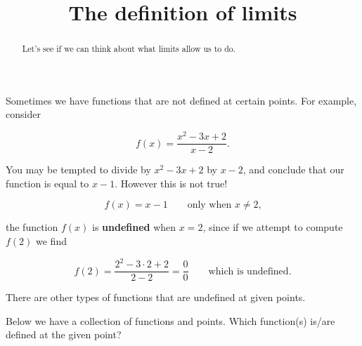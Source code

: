 \documentclass{ximera}
\title{The definition of limits}
\begin{document}
\begin{abstract}
  Let's see if we can think about what limits allow us to do.
\end{abstract}
\maketitle


Sometimes we have functions that are not defined at certain
points. For example, consider

\[
f(x) = \frac{x^2 - 3x + 2}{x-2}.
\]

You may be tempted to divide by $x^2 - 3x + 2$ by $x-2$, and conclude
that our function is equal to $x-1$. However this is not true!

\[
f(x) = x-1 \qquad\text{only when $x\ne 2$,}
\]

the function $f(x)$ is \textbf{undefined} when $x= 2$, since if we
attempt to compute $f(2)$ we find

\[
f(2) = \frac{2^2-3\cdot 2+2}{2-2} = \frac{0}{0}\qquad\text{which is  undefined}.
\]

There are other types of functions that are undefined at given points. 

\begin{question}
  Below we have a collection of functions and points. Which
  function(s) is/are defined at the given point?
\begin{solution}
\begin{multiple-choice}
\end{multiple-choice}
\end{solution}
\end{question}
\end{document}
